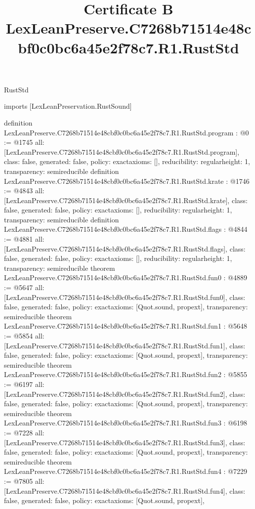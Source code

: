 \begin{lexlean}{RustStd}
\title{Certificate B LexLeanPreserve.C7268b71514e48cbf0c0bc6a45e2f78c7.R1.RustStd}
\begin{coremodule}
imports [LexLeanPreservation.RustSound]

definition LexLeanPreserve.C7268b71514e48cbf0c0bc6a45e2f78c7.R1.RustStd.program : @0 := @1745 {
  all: [LexLeanPreserve.C7268b71514e48cbf0c0bc6a45e2f78c7.R1.RustStd.program],
  class: false,
  generated: false,
  policy: exact{axioms: []},
  reducibility: regular{height: 1},
  transparency: semireducible
}
definition LexLeanPreserve.C7268b71514e48cbf0c0bc6a45e2f78c7.R1.RustStd.krate : @1746 := @4843 {
  all: [LexLeanPreserve.C7268b71514e48cbf0c0bc6a45e2f78c7.R1.RustStd.krate],
  class: false,
  generated: false,
  policy: exact{axioms: []},
  reducibility: regular{height: 1},
  transparency: semireducible
}
definition LexLeanPreserve.C7268b71514e48cbf0c0bc6a45e2f78c7.R1.RustStd.flags : @4844 := @4881 {
  all: [LexLeanPreserve.C7268b71514e48cbf0c0bc6a45e2f78c7.R1.RustStd.flags],
  class: false,
  generated: false,
  policy: exact{axioms: []},
  reducibility: regular{height: 1},
  transparency: semireducible
}
theorem LexLeanPreserve.C7268b71514e48cbf0c0bc6a45e2f78c7.R1.RustStd.fun0 : @4889 := @5647 {
  all: [LexLeanPreserve.C7268b71514e48cbf0c0bc6a45e2f78c7.R1.RustStd.fun0],
  class: false,
  generated: false,
  policy: exact{axioms: [Quot.sound, propext]},
  transparency: semireducible
}
theorem LexLeanPreserve.C7268b71514e48cbf0c0bc6a45e2f78c7.R1.RustStd.fun1 : @5648 := @5854 {
  all: [LexLeanPreserve.C7268b71514e48cbf0c0bc6a45e2f78c7.R1.RustStd.fun1],
  class: false,
  generated: false,
  policy: exact{axioms: [Quot.sound, propext]},
  transparency: semireducible
}
theorem LexLeanPreserve.C7268b71514e48cbf0c0bc6a45e2f78c7.R1.RustStd.fun2 : @5855 := @6197 {
  all: [LexLeanPreserve.C7268b71514e48cbf0c0bc6a45e2f78c7.R1.RustStd.fun2],
  class: false,
  generated: false,
  policy: exact{axioms: [Quot.sound, propext]},
  transparency: semireducible
}
theorem LexLeanPreserve.C7268b71514e48cbf0c0bc6a45e2f78c7.R1.RustStd.fun3 : @6198 := @7228 {
  all: [LexLeanPreserve.C7268b71514e48cbf0c0bc6a45e2f78c7.R1.RustStd.fun3],
  class: false,
  generated: false,
  policy: exact{axioms: [Quot.sound, propext]},
  transparency: semireducible
}
theorem LexLeanPreserve.C7268b71514e48cbf0c0bc6a45e2f78c7.R1.RustStd.fun4 : @7229 := @7805 {
  all: [LexLeanPreserve.C7268b71514e48cbf0c0bc6a45e2f78c7.R1.RustStd.fun4],
  class: false,
  generated: false,
  policy: exact{axioms: [Quot.sound, propext]},
}
\end{coremodule}
\end{lexlean}
